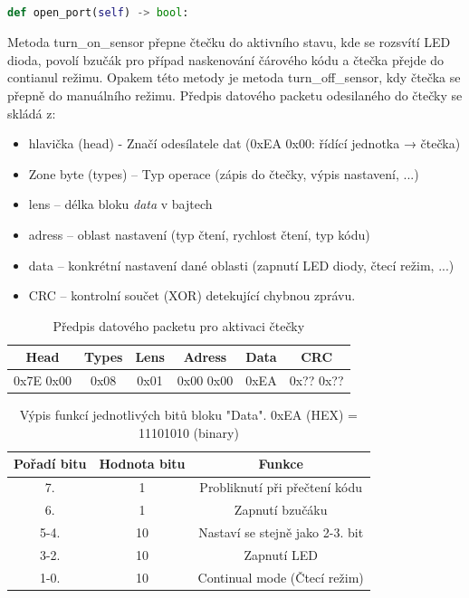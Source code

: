 \begin{lstlisting}[language=Python,breaklines=true, frame=single,postbreak=\mbox{\tiny$\hookrightarrow$}]

def open_port(self) -> bool:
\end{lstlisting}

\bigskip
Metoda turn\_on\_sensor přepne čtečku do aktivního stavu, kde se rozsvítí LED dioda, povolí bzučák pro případ naskenování čárového kódu a čtečka přejde do contianul režimu. Opakem této metody je metoda turn\_off\_sensor, kdy čtečka se přepně do manuálního režimu. Předpis datového packetu odesilaného do čtečky se skládá z:

\begin{itemize}
    \item hlavička (head) - Značí odesílatele dat (0xEA 0x00: řídící jednotka → čtečka)
    \item Zone byte (types) – Typ operace (zápis do čtečky, výpis nastavení, ...)
    \item lens – délka bloku \textit{data} v bajtech
    \item adress – oblast nastavení (typ čtení, rychlost čtení, typ kódu)
    \item data – konkrétní nastavení dané oblasti (zapnutí LED diody, čtecí režim, ...)
    \item CRC – kontrolní součet (XOR) detekující chybnou zprávu. 
\end{itemize}

\begin{table}[H]
    \centering
    \begin{tabular}{|c|c|c|c|c|c|}
         \hline
         Head & Types & Lens & Adress & Data & CRC\\ \hline
         0x7E 0x00 & 0x08 & 0x01 & 0x00 0x00 & 0xEA & 0x?? 0x??\\
         \hline
    \end{tabular}
    \caption{Předpis datového packetu pro aktivaci čtečky}
    \label{tab:my_label}
\end{table}

\begin{table}[H]
    \centering
    \begin{tabular}{|c|c|c|}
         \hline
         Pořadí bitu & Hodnota bitu & Funkce \\ \hline
         7. & 1 & Probliknutí při přečtení kódu \\ \hline
         6. & 1 & Zapnutí bzučáku \\ \hline
         5-4. & 10 & Nastaví se stejně jako 2-3. bit \\ \hline
         3-2. & 10 & Zapnutí LED \\ \hline
         1-0. & 10 & Continual mode (Čtecí režim)\\ \hline
    \end{tabular}
    \caption{Výpis funkcí jednotlivých bitů bloku "Data". 0xEA (HEX) = 11101010 (binary)}
    \label{tab:my_label}
\end{table}

